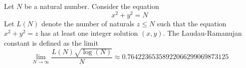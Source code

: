 \documentclass[12pt]{article}
\begin{document}
Let $N$ be a natural number. Consider the equation
$$x^2+y^2=N$$
Let $L(N)$ denote the number of naturals $z \leq N$ such that the equation $x^2+y^2=z$ has at least one integer solution $(x,y)$.
The Laudau-Ramanujan constant is defined as the limit
$$\lim_{N\rightarrow \infty} \frac{L(N)\sqrt{\log(N)}}{N}\approx 0.76422365358922066299069873125$$
\end{document}
